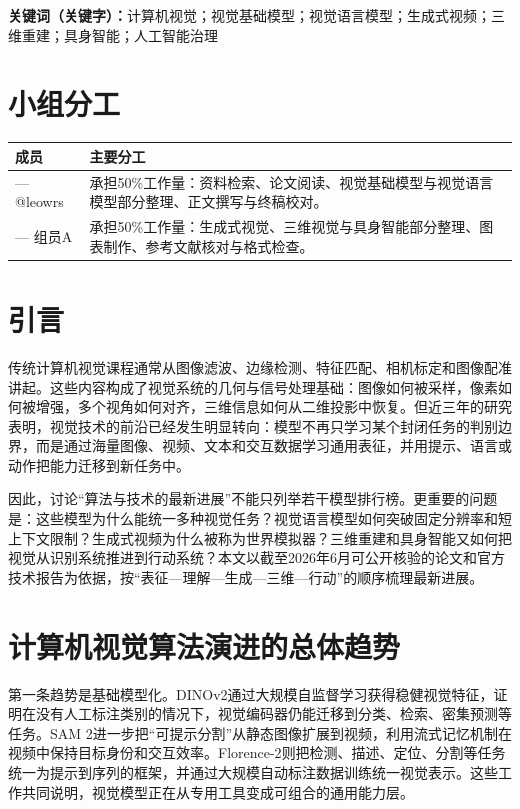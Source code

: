 \documentclass[UTF8,a4paper,12pt]{ctexart}
\newcommand{\model}[1]{\textsf{#1}}
\begin{document}
\noindent\textbf{关键词（关键字）：}计算机视觉；视觉基础模型；视觉语言模型；生成式视频；三维重建；具身智能；人工智能治理

\newpage
\tableofcontents
\newpage

\section*{小组分工}
\begin{table}[h]
\centering
\begin{tabularx}{\textwidth}{C{3.5cm}Y}
\toprule
\textbf{成员} & \textbf{主要分工} \\
\midrule
— @leowrs & 承担50\%工作量：资料检索、论文阅读、视觉基础模型与视觉语言模型部分整理、正文撰写与终稿校对。 \\
— 组员A & 承担50\%工作量：生成式视觉、三维视觉与具身智能部分整理、图表制作、参考文献核对与格式检查。 \\
\bottomrule
\end{tabularx}
\end{table}

\newpage
{}

\section{引言}
传统计算机视觉课程通常从图像滤波、边缘检测、特征匹配、相机标定和图像配准讲起。这些内容构成了视觉系统的几何与信号处理基础：图像如何被采样，像素如何被增强，多个视角如何对齐，三维信息如何从二维投影中恢复。但近三年的研究表明，视觉技术的前沿已经发生明显转向：模型不再只学习某个封闭任务的判别边界，而是通过海量图像、视频、文本和交互数据学习通用表征，并用提示、语言或动作把能力迁移到新任务中。

因此，讨论“算法与技术的最新进展”不能只列举若干模型排行榜。更重要的问题是：这些模型为什么能统一多种视觉任务？视觉语言模型如何突破固定分辨率和短上下文限制？生成式视频为什么被称为世界模拟器？三维重建和具身智能又如何把视觉从识别系统推进到行动系统？本文以截至2026年6月可公开核验的论文和官方技术报告为依据，按“表征—理解—生成—三维—行动”的顺序梳理最新进展。

\section{计算机视觉算法演进的总体趋势}
第一条趋势是基础模型化。\model{DINOv2}通过大规模自监督学习获得稳健视觉特征，证明在没有人工标注类别的情况下，视觉编码器仍能迁移到分类、检索、密集预测等任务\cite{dinov2}。\model{SAM 2}进一步把“可提示分割”从静态图像扩展到视频，利用流式记忆机制在视频中保持目标身份和交互效率\cite{sam2}。\model{Florence-2}则把检测、描述、定位、分割等任务统一为提示到序列的框架，并通过大规模自动标注数据训练统一视觉表示\cite{florence2}。这些工作共同说明，视觉模型正在从专用工具变成可组合的通用能力层。
\end{document}
